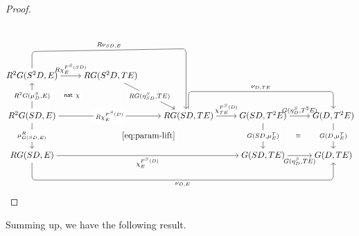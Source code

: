 \documentclass[12pt,dvipsnames,oneside]{amsart}
\theoremstyle{plain}
\theoremstyle{remark}
\theoremstyle{definition}
\newcommand{\free}{F}
\newcommand{\G}{G}
\begin{document}
\begin{proof}
\[\begin{tikzcd}[ampersand replacement=\&,cramped]
    \end{tikzcd}
  \]
  \[
    \begin{tikzcd}[ampersand replacement=\&,cramped,column sep=24pt,row sep=30pt]
      {R^2\G(S^2D,E)} \& {R\G(S^2D,TE)} \&\&\& \\
      {R^2\G(SD,E)} \&\& {R\G(SD,TE)} \& {\G(SD,T^2E)} \& {\G(D,T^2E)} \\
      {R\G(SD,E)} \&\&\& {\G(SD,TE)} \& {\G(D,TE)}
      \arrow["{R\chi^{\free^S(SD)}_E}", from=1-1, to=1-2]
      \arrow["{R\G(\eta^S_{SD},TE)}"{description}, from=1-2, to=2-3]
      \arrow["{R^2\G(\mu^S_D,E)}"{description}, from=2-1, to=1-1]
      \arrow["{R\chi^{\free^S(D)}_E}"{description}, from=2-1, to=2-3]
      \arrow["{\mu^R_{\G(SD,E)}}"{description}, from=2-1, to=3-1]
      \arrow["{\chi^{\free^S(D)}_{TE}}", from=2-3, to=2-4]
      \arrow["{\G(\eta^S_D,T^2E)}", from=2-4, to=2-5]
      \arrow["{\G(SD,\mu^T_E)}"{description}, from=2-4, to=3-4]
      \arrow["{\G(D,\mu^T_E)}"{description}, from=2-5, to=3-5]
      \arrow["{\chi^{\free^S(D)}_E}"', from=3-1, to=3-4]
      \arrow["{\G(\eta^S_D,TE)}"', from=3-4, to=3-5]
      \arrow["\mathsf{nat}\ \chi"{description}, draw=none, from=2-1, to=1-2]
      \arrow["{\eqref{eq:param-lift}}"{description}, draw=none, from=2-1, to=3-4]
      \arrow["\equiv"{description}, draw=none, from=3-4, to=2-5]
      \arrow["{R\nu_{SD,E}}", from=1-1, to=2-3, rounded corners,
      to path={-- ([yshift=1cm]\tikztostart.center) -- ([xshift=-0.1cm,yshift=2.75cm]\tikztotarget.center) \tikztonodes -- ([xshift=-0.1cm]\tikztotarget.north)}]
      \arrow["{\nu_{D,TE}}", from=2-3, to=2-5, rounded corners,
      to path={-- ([yshift=1cm]\tikztostart.center) -- ([yshift=1cm]\tikztotarget.center) \tikztonodes -- (\tikztotarget.north)}]
      \arrow["{\nu_{D,E}}"', from=3-1, to=3-5, rounded corners,
      to path={-- ([yshift=-1cm]\tikztostart.center) -- ([yshift=-1cm]\tikztotarget.center) \tikztonodes -- (\tikztotarget.south)}]
    \end{tikzcd}
  \]
\end{proof}

Summing up, we have the following result.
\end{document}
